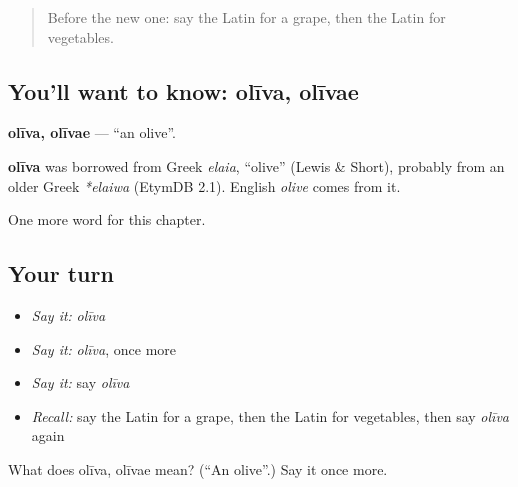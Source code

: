 \begin{quote}
Before the new one: say the Latin for a grape, then the Latin for vegetables.
\end{quote}

\subsection*{You'll want to know: olīva, olīvae}
\textbf{olīva, olīvae} — \textquotedblleft{}an olive\textquotedblright{}.

\begin{cousinweb}
\textbf{olīva} was borrowed from Greek \emph{elaia}, \textquotedblleft{}olive\textquotedblright{} (Lewis \& Short), probably from an older Greek \emph{*elaiwa} (EtymDB 2.1). English \emph{olive} comes from it.
\end{cousinweb}

\begin{grammarlens}[title={What you've built}]
One more word for this chapter.
\end{grammarlens}

\subsection*{Your turn}
\begin{itemize}
\raggedright
  \item \emph{Say it:} \emph{olīva}
  \item \emph{Say it:} \emph{olīva}, once more
  \item \emph{Say it:} say \emph{olīva}
  \item \emph{Recall:} say the Latin for a grape, then the Latin for vegetables, then say \emph{olīva} again
\end{itemize}

\begin{tcolorbox}[breakable,colback=teal!4,colframe=teal!35!black,title={Before you move on}]
What does olīva, olīvae mean? (\textquotedblleft{}An olive\textquotedblright{}.) Say it once more.
\end{tcolorbox}
